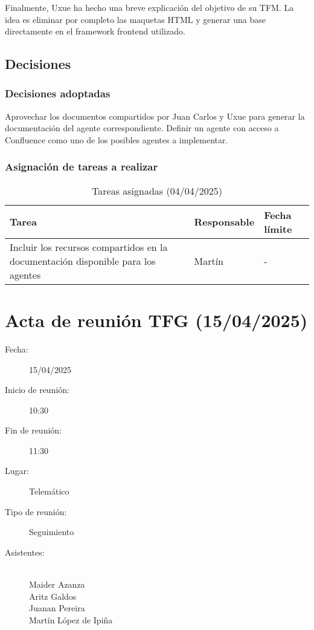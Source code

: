 Finalmente, Uxue ha hecho una breve explicación del objetivo de su TFM. La idea es eliminar por completo las maquetas HTML y generar una base directamente en el framework frontend utilizado.

\subsection{Decisiones}
\subsubsection{Decisiones adoptadas}
Aprovechar los documentos compartidos por Juan Carlos y Uxue para generar la documentación del agente correspondiente.
Definir un agente con acceso a Confluence como uno de los posibles agentes a implementar.

\subsubsection{Asignación de tareas a realizar}
\begin{table}[h]
    \centering
    \begin{tabular}{|p{8cm}|p{3cm}|p{3cm}|}
        \hline
        \textbf{Tarea} & \textbf{Responsable} & \textbf{Fecha límite} \\
        \hline
        Incluir los recursos compartidos en la documentación disponible para los agentes & Martín & - \\
        \hline
    \end{tabular}
    \caption{Tareas asignadas (04/04/2025)}
\end{table}

\clearpage

\section{Acta de reunión TFG (15/04/2025)}

\begin{description}
    \item[Fecha:] 15/04/2025
    \item[Inicio de reunión:] 10:30
    \item[Fin de reunión:] 11:30
    \item[Lugar:] Telemático
    \item[Tipo de reunión:] Seguimiento
    \item[Asistentes:] ~\\
    Maider Azanza\\
    Aritz Galdos\\
    Juanan Pereira\\
    Martín López de Ipiña
\end{description}

